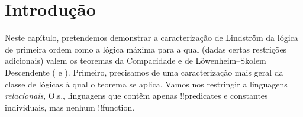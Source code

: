 \documentclass[../../../include/open-logic-section]{subfiles}
\begin{document}
\section{Introdução}

Neste capítulo, pretendemos demonstrar a caracterização de Lindstr\"om da
lógica de primeira ordem como a lógica máxima para a qual (dadas certas
restrições adicionais) valem os teoremas da Compacidade e de
L\"owenheim--Skolem Descendente
( e
). Primeiro, precisamos de uma
caracterização mais geral da classe de lógicas à qual o teorema se aplica.
Vamos nos restringir a linguagens \emph{relacionais}, O.s.\@, linguagens que
contêm apenas !!{predicate}s e constantes individuais, mas nenhum
!!{function}.
\end{document}
